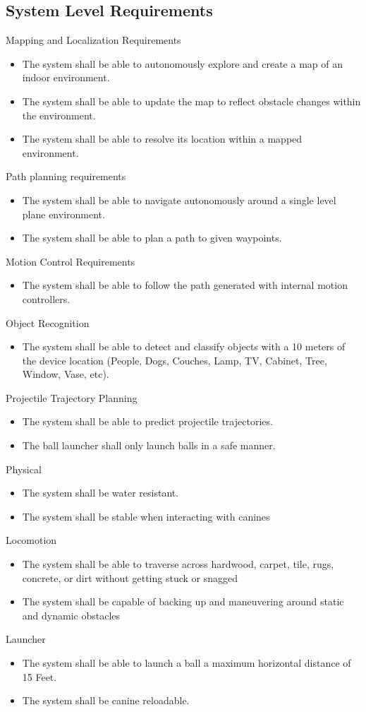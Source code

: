 \documentclass[11pt]{article}
\begin{document}
\subsection{System Level Requirements}
Mapping and Localization Requirements
\begin{itemize}
    \item The system  shall be able to autonomously explore and create a map of an indoor environment.
    \item The system  shall be able to update the map to reflect obstacle changes within the environment.
    \item The system  shall be able to resolve its location within a mapped environment.
\end{itemize}
Path planning requirements
\begin{itemize}
    \item The system shall be able to navigate autonomously around a single level plane environment.
    \item The system shall be able to plan a path to given waypoints.
\end{itemize}
Motion Control Requirements
\begin{itemize}
    \item The system shall be able to follow the path generated with internal motion controllers.
\end{itemize}
Object Recognition
\begin{itemize}
    \item The system shall be able to detect and classify objects with a 10 meters of the device location (People, Dogs, Couches, Lamp, TV, Cabinet, Tree, Window, Vase, etc).
\end{itemize}
Projectile Trajectory Planning
\begin{itemize}
    \item The system shall be able to predict projectile trajectories.
    \item The ball launcher shall only launch balls in a safe manner.
\end{itemize}
Physical
\begin{itemize}
    \item The system shall be water resistant.
    \item The system shall be stable when interacting with canines
\end{itemize}
Locomotion
\begin{itemize}
    \item The system shall be able to traverse across hardwood, carpet, tile, rugs, concrete, or dirt without getting stuck or snagged
    \item The system shall be capable of backing up and maneuvering around static and dynamic obstacles
\end{itemize}
Launcher
\begin{itemize}
    \item The system shall be able to launch a ball a maximum horizontal distance of 15 Feet.
    \item The system shall be canine reloadable.
\end{itemize}
\end{document}
